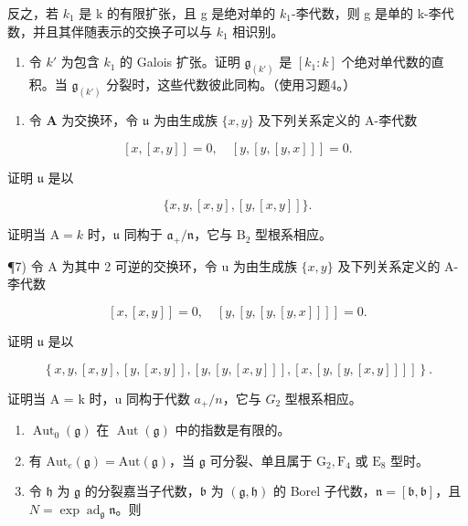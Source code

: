 反之，若 \(k_{1}\) 是 k 的有限扩张，且 g 是绝对单的 \(k_{1}\)-李代数，则 g 是单的 k-李代数，并且其伴随表示的交换子可以与 \(k_{1}\) 相识别。

\begin{enumerate}
\def\labelenumi{\alph{enumi})}
\setcounter{enumi}{1}
\tightlist
\item
  令 \(k'\) 为包含 \(k_{1}\) 的 Galois 扩张。证明 \(\mathfrak{g}_{(k')}\) 是 \([k_{1}:k]\) 个绝对单代数的直积。当 \(\mathfrak{g}_{(k')}\) 分裂时，这些代数彼此同构。（使用习题4。）
\end{enumerate}

\begin{enumerate}
\def\labelenumi{\arabic{enumi})}
\setcounter{enumi}{5}
\tightlist
\item
  令 \(\mathbf{A}\) 为交换环，令 \(\mathfrak{u}\) 为由生成族 \(\{x, y\}\) 及下列关系定义的 A-李代数
\end{enumerate}

\[
[ x, [ x, y ] ] = 0, \quad [ y, [ y, [ y, x ] ] ] = 0.
\]

证明 \(\mathfrak{u}\) 是以

\[
\{x, y, [ x, y ], [ y, [ x, y ] ] \}.
\]

证明当 \(\mathrm{A} = k\) 时，\(\mathfrak{u}\) 同构于 \(\mathfrak{a}_{+} / \mathfrak{n}\)，它与 \(\mathrm{B}_2\) 型根系相应。

¶7) 令 A 为其中 2 可逆的交换环，令 u 为由生成族 \(\{x,y\}\) 及下列关系定义的 A-李代数

\[
[ x, [ x, y ] ] = 0, \quad [ y, [ y, [ y, [ y, x ] ] ] ] = 0.
\]

证明 \(\mathfrak{u}\) 是以

\[
\left. \right.\left\{x, y, [ x, y ], [ y, [ x, y ] ], [ y, [ y, [ x, y ] ] ], [ x, [ y, [ y, [ x, y ] ] ] ] \right\}.
\]

证明当 A = k 时，u 同构于代数 \(a_{+}/n\)，它与 \(G_{2}\) 型根系相应。


\begin{enumerate}
\def\labelenumi{\arabic{enumi})}
\item
  \(\operatorname{Aut}_{0}(\mathfrak{g})\) 在 \(\operatorname{Aut}(\mathfrak{g})\) 中的指数是有限的。
\item
  有 \(\mathrm{Aut}_e(\mathfrak{g}) = \mathrm{Aut}(\mathfrak{g})\)，当 \(\mathfrak{g}\) 可分裂、单且属于 \(\mathrm{G}_2, \mathrm{F}_4\) 或 \(\mathrm{E}_8\) 型时。
\item
  令 \(\mathfrak{h}\) 为 \(\mathfrak{g}\) 的分裂嘉当子代数，\(\mathfrak{b}\) 为 \((\mathfrak{g},\mathfrak{h})\) 的 Borel 子代数，\(\mathfrak{n} = [\mathfrak{b},\mathfrak{b}]\)，且 \(N = \exp \operatorname{ad}_{\mathfrak{g}}\mathfrak{n}\)。则
\end{enumerate}

